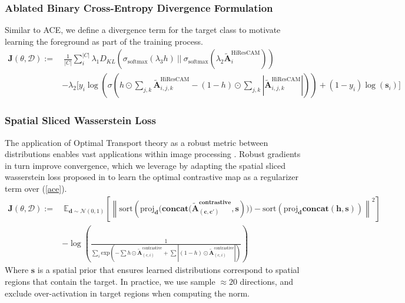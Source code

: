 \documentclass{article}
\theoremstyle{plain}
\theoremstyle{definition}
\theoremstyle{remark}
\newcommand{\contcam}[2]{\tilde{\mathcal{\bm{A}}}^{\text{contrastive}}_{(#1, #2)}}
\newcommand{\vectorproj}[2][]{\text{proj}_{\vect{#1}}\vect{#2}}
\newcommand{\vect}{\mathbf}
\begin{document}
\subsubsection{Ablated Binary Cross-Entropy Divergence Formulation}

Similar to ACE, we define a divergence term for the target class to motivate learning the foreground as part of the training process.
\begin{equation}
	\begin{split}
		\mathcal{\bm{J}}(\theta, \mathcal{D}) := &\ \frac{1}{|C|} \sum^{|C|}_{i} \lambda_1 D_{KL}(\sigma_{\text{softmax}}(\lambda_3 h)\ ||\ \sigma_{\text{softmax}}(\lambda_2 \tilde{\mathcal{\bm{A}}}_{i}^{\text{HiResCAM}})) \\
		&- \lambda_2 \bigg[ y_i \log \left(\sigma\left(h \odot \sum_{j,k}\tilde{\mathcal{\bm{A}}}_{i,j,k}^{\text{HiResCAM}} - (1-h) \odot \sum_{j,k}|\tilde{\mathcal{\bm{A}}}_{i,j,k}^{\text{HiResCAM}}|\right) \right) + (1 - y_i) \log \left( \bm{s}_i \right) \bigg]
	\end{split}
\end{equation}

\subsubsection{Spatial Sliced Wasserstein Loss}

The application of Optimal Transport theory as a robust metric between distributions enables vast applications within image processing \citep{papadakis2015optimal}. Robust gradients in turn improve convergence, which we leverage by adapting the spatial sliced wasserstein loss proposed in \citet{heitz2021sliced} to learn the optimal contrastive map as a regularizer term over (\ref{ace}).
\begin{equation}
	\begin{split}
		\mathcal{\bm{J}}(\theta, \mathcal{D}) := &\ \mathbb{E}_{\mathbf{d} \sim \mathcal{N}(0, 1)}\left[\left\| \text{sort}(\vectorproj[d]{(\text{concat}(\contcam{c}{c'}, \bm{s}}))) - \text{sort}(\vectorproj[d]{\text{concat}(h, s)}) \right\|^2 \right] \\
		&-\log \left( \frac{1}{\sum_i \text{exp}\left(-\sum h \odot \contcam{c}{i} + \sum |(1-h) \odot \contcam{c}{i}|\right)} \right)
	\end{split}
\end{equation}
Where $\mathbf{s}$ is a spatial prior that ensures learned distributions correspond to spatial regions that contain the target. In practice, we use sample $\approx 20$ directions, and exclude over-activation in target regions when computing the norm.
\end{document}
